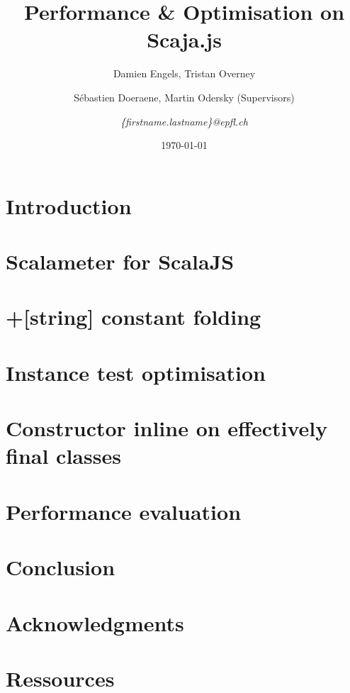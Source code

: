 \documentclass{article}
\begin{document}
\title{Performance \& Optimisation on Scaja.js}
\author{Damien Engels, Tristan Overney\and S\'{e}bastien Doeraene, Martin
Odersky (Supervisors)\and \emph{\{firstname.lastname\}@epfl.ch}}
\date{\today}
\maketitle

\nocite{*}

\section{Introduction}


\section{Scalameter for ScalaJS} \label{scalameter}


\section{+[string] constant folding}


\section{Instance test optimisation}


\section{Constructor inline on effectively final classes}


\section{Performance evaluation}


\section{Conclusion}


\section*{Acknowledgments}


\section*{Ressources}


{}

\end{document}
